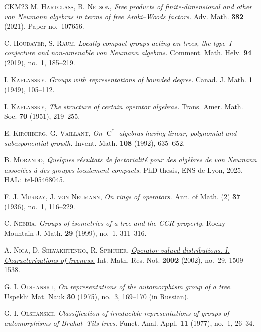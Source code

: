 \documentclass[11pt]{amsart}
\numberwithin{equation}{section}
\newcommand{\Cstar}{\operatorname{C}^*}
\theoremstyle{definition}
\begin{document}
\begin{thebibliography}{CKM23}
     \textsc{M. Hartglass, B. Nelson}, \textit{Free products of finite-dimensional and other von Neumann algebras in terms of free Araki--Woods factors.} Adv. Math. \textbf{382} (2021), Paper no.~107656.

     \textsc{C. Houdayer, S. Raum}, \textit{Locally compact groups acting on trees, the type~\textup{I} conjecture and non-amenable von Neumann algebras.} Comment. Math. Helv. \textbf{94} (2019), no.~1, 185--219.

     \textsc{I. Kaplansky}, \textit{Groups with representations of bounded degree.} Canad. J. Math. \textbf{1} (1949), 105--112.

     \textsc{I. Kaplansky}, \textit{The structure of certain operator algebras.} Trans. Amer. Math. Soc. \textbf{70} (1951), 219--255.

     \textsc{E. Kirchberg, G. Vaillant}, \textit{On $\Cstar$-algebras having linear, polynomial and subexponential growth.} Invent. Math. \textbf{108} (1992), 635--652.

     \textsc{B. Morando}, \textit{Quelques résultats de factorialité pour des algèbres de von Neumann associées à des groupes localement compacts.} PhD thesis, ENS de Lyon, 2025. \href{https://cnrs.hal.science/tel-05468045}{HAL:~tel-05468045}.

     \textsc{F. J. Murray, J. von Neumann}, \textit{On rings of operators.} Ann. of Math. (2) \textbf{37} (1936), no.~1, 116--229.

     \textsc{C. Nebbia}, \textit{Groups of isometries of a tree and the \textup{CCR} property.} Rocky Mountain J. Math. \textbf{29} (1999), no.~1, 311--316.

     \textsc{A. Nica, D. Shlyakhtenko, R. Speicher}, \textit{\href{https://arxiv.org/abs/math/0201001v1}{Operator-valued distributions. I. Characterizations of freeness.}} Int. Math. Res. Not. \textbf{2002} (2002), no.~29, 1509--1538.

     \textsc{G. I. Olshanskii}, \textit{On representations of the automorphism group of a tree.} Uspekhi Mat. Nauk \textbf{30} (1975), no.~3, 169--170 (in Russian).

     \textsc{G. I. Olshanskii}, \textit{Classification of irreducible representations of groups of automorphisms of Bruhat--Tits trees.} Funct. Anal. Appl. \textbf{11} (1977), no.~1, 26--34.


\end{thebibliography}
\end{document}

